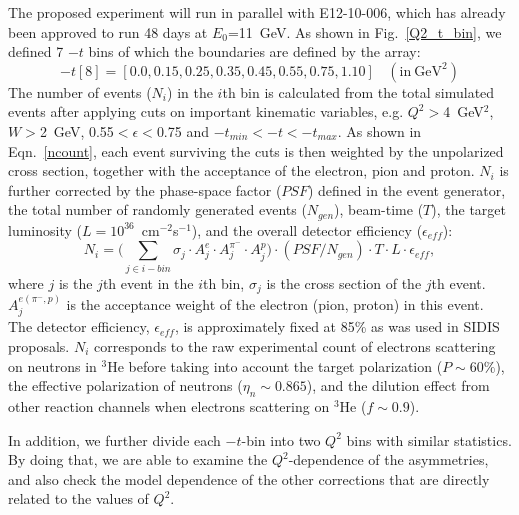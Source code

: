 The proposed experiment will run in parallel with E12-10-006, which has already
been approved to run 48 days at $E_{0}$=11~GeV.  As shown in
Fig.~\ref{Q2_t_bin}, we defined 7 $-t$ bins of which the boundaries are
defined by the array:
 \begin{equation}
-t[8] = [0.0, 0.15, 0.25, 0.35, 0.45, 0.55, 0.75, 1.10]~~~~(\mathrm{in~GeV^{2}})
 \end{equation}
The number of events ($N_{i}$) in the $i$th bin is calculated from the total
simulated events after applying cuts on important kinematic variables,
e.g. $Q^{2}>$4~GeV$^{2}$, $W>$2~GeV, 0.55$<\epsilon<$0.75 and
$-t_{min}<-t<-t_{max}$. As shown in Eqn.~\ref{ncount}, each event surviving the
cuts is then weighted by the unpolarized cross section, together with the
acceptance of the electron, pion and proton. $N_{i}$ is further corrected by
the phase-space factor ($PSF$) defined in the event generator, the total number
of randomly generated events ($N_{gen}$), beam-time ($T$), the target
luminosity ($L=10^{36}$~cm$^{-2}$s$^{-1}$), and the overall detector efficiency 
($\epsilon_{eff}$):
 \begin{equation}
     N_{i} = \bigl(\sum_{j\in i-bin} \sigma_{j}\cdot A^{e}_{j} \cdot
     A^{\pi^{-}}_{j} \cdot A^{p}_{j}\bigr) \cdot (PSF/N_{gen}) \cdot T \cdot L \cdot
     \epsilon_{eff},
     \label{ncount}
 \end{equation}
where $j$ is the $j$th event in the $i$th bin, $\sigma_{j}$ is the cross
section of the $j$th event. $A^{e(\pi^{-},p)}_{j}$ is the acceptance weight of the
electron (pion, proton) in this event. The detector efficiency,
$\epsilon_{eff}$, is approximately fixed at 85\% as was used in SIDIS
proposals. $N_{i}$ corresponds to the raw experimental count of electrons
scattering on neutrons in $\mathrm{^{3}He}$ before taking into account the
target polarization ($P\sim60\%$), the effective polarization of neutrons
($\eta_{n}\sim0.865$), and the dilution effect from other reaction channels
when electrons scattering on $\mathrm{^{3}He}$ ($f \sim 0.9$). 

In addition, we further divide each $-t$-bin into two $Q^{2}$ bins with similar
statistics.  By doing that, we are able to examine the $Q^{2}$-dependence of the
asymmetries, and also check the model dependence of the other corrections that
are directly related to the values of $Q^{2}$.

